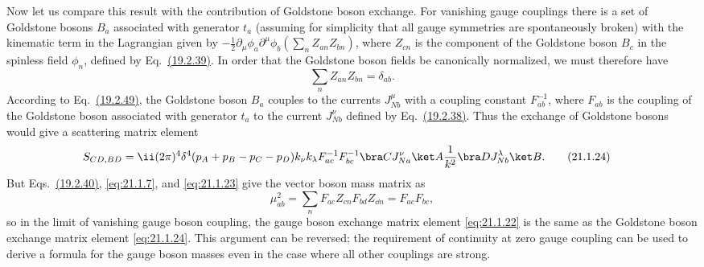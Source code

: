 Now let us compare this result with the contribution of Goldstone boson
exchange. For vanishing gauge couplings there is a set of Goldstone bosons
$B_a$ associated with generator $t_a$ (assuming for simplicity
that all gauge symmetries are spontaneously broken) with the kinematic term
in the Lagrangian given by
$-\frac12\partial_\mu\phi_a\partial^\mu\phi_b
\left(\sum_nZ_{a n}Z_{b n}\right)$, where $Z_{c n}$ is the
component of the Goldstone boson $B_c$ in the spinless field $\phi_n$,
defined by
Eq.~\hyperref[eq:19.2.39]{(19.2.39)}. In order that the Goldstone boson
fields be canonically normalized, we must therefore have
\begin{equation}
 \sum_n Z_{a n}Z_{b n}=\delta_{ab}.
 \tag{21.1.23}\label{eq:21.1.23}
\end{equation}
According to Eq.~\hyperref[eq:19.2.49]{(19.2.49)}, the Goldstone boson
$B_a$ couples to the currents $J_{Nb}^{\mu}$ with a coupling
constant $F^{-1}_{ab}$, where $F_{ab}$ is the coupling of
the Goldstone boson associated with generator $t_a$ to the current
$J_{Nb}^{\nu}$ defined by Eq.~\hyperref[eq:19.2.38]{(19.2.38)}. Thus
the exchange of Goldstone bosons would give a scattering matrix element
\begin{align}
 S_{CD,BD}={}&\ii(2\pi)^4\delta^4(p_A+p_B-p_C-p_D)
 k_\nu k_\lambda
 F^{-1}_{ac}F^{-1}_{bc}
 \bra C J_{Na}^{\nu}\ket A
 \frac1{k^2}
 \bra D J_{Nb}^{\lambda}\ket B.
 \tag{21.1.24}\label{eq:21.1.24}
\end{align}
But Eqs.~\hyperref[eq:19.2.40]{(19.2.40)}, \eqref{eq:21.1.7}, and
\eqref{eq:21.1.23} give the vector boson mass matrix as
\begin{equation}
 \mu^2_{ab}
 =\sum_n F_{ac}Z_{c n}
 F_{bd}Z_{\dd n}
 =F_{ac}F_{bc},
 \tag{21.1.25}\label{eq:21.1.25}
\end{equation}
so in the limit of vanishing gauge boson coupling, the gauge boson exchange
matrix element \eqref{eq:21.1.22} is the same as the Goldstone boson
exchange matrix element \eqref{eq:21.1.24}. This argument can be reversed;
the requirement of continuity at zero gauge coupling can be used to derive
a formula for the gauge boson masses even in the case where all other
couplings are strong.
